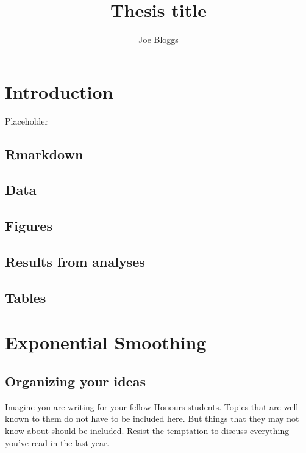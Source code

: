 \documentclass{monashthesis}
\author{Joe Bloggs}
\title{Thesis title}
\begin{document}

\titlepage

{\sf\tighttoc\doublespacing}

\clearpage{}\setcounter{page}{0}

\hypertarget{ch:intro}{%
\chapter{Introduction}\label{ch:intro}}

Placeholder

\hypertarget{rmarkdown}{%
\section{Rmarkdown}\label{rmarkdown}}

\hypertarget{data}{%
\section{Data}\label{data}}

\hypertarget{figures}{%
\section{Figures}\label{figures}}

\hypertarget{results-from-analyses}{%
\section{Results from analyses}\label{results-from-analyses}}

\hypertarget{tables}{%
\section{Tables}\label{tables}}

\hypertarget{sec:expsmooth}{%
\chapter{Exponential Smoothing}\label{sec:expsmooth}}

\hypertarget{organizing-your-ideas}{%
\section{Organizing your ideas}\label{organizing-your-ideas}}

Imagine you are writing for your fellow Honours students. Topics that are well-known to them do not have to be included here. But things that they may not know about should be included. Resist the temptation to discuss everything you've read in the last year.
\end{document}
